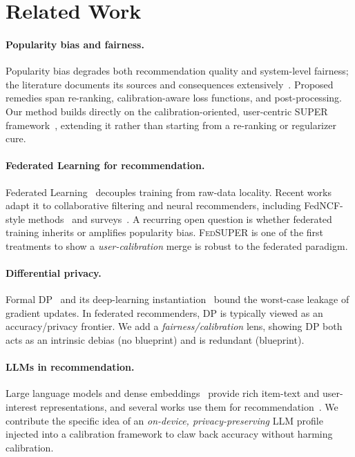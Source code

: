 \documentclass{article}
\newcommand{\Fed}{\textsc{FedSUPER}}
\begin{document}
\section{Related Work}
\label{sec:related}

\paragraph{Popularity bias and fairness.}
Popularity bias degrades both recommendation quality and system-level fairness; the literature
documents its sources and consequences extensively~\cite{abdollahpouri2019unfairness,
abdollahpouri2020multistakeholder,santos2010xquad}. Proposed remedies span re-ranking,
calibration-aware loss functions, and post-processing. Our method builds directly on the
calibration-oriented, user-centric SUPER framework~\cite{yavru2026super}, extending it rather than
starting from a re-ranking or regularizer cure.

\paragraph{Federated Learning for recommendation.} Federated Learning~\cite{mcmahan2017fedavg,
konecny2016fed} decouples training from raw-data locality. Recent works adapt it to collaborative
filtering and neural recommenders, including FedNCF-style methods~\cite{he2017ncf} and
surveys~\cite{sun2022fedsurvey}. A recurring open question is whether federated training inherits
or amplifies popularity bias. \Fed{} is one of the first treatments to show a \emph{user-calibration}
merge is robust to the federated paradigm.

\paragraph{Differential privacy.} Formal DP~\cite{dwork2014dpbook} and its deep-learning
instantiation~\cite{abadi2016dp} bound the worst-case leakage of gradient updates. In federated
recommenders, DP is typically viewed as an accuracy/privacy frontier. We add a
\emph{fairness/calibration} lens, showing DP both acts as an intrinsic debias (no blueprint) and is
redundant (blueprint).

\paragraph{LLMs in recommendation.} Large language models and dense embeddings~\cite{reimers2019sbert}
provide rich item-text and user-interest representations, and several works use them for
recommendation~\cite{lyu2023llmrec}. We contribute the specific idea of an \emph{on-device,
privacy-preserving} LLM profile injected into a calibration framework to claw back accuracy without
harming calibration.
\end{document}
